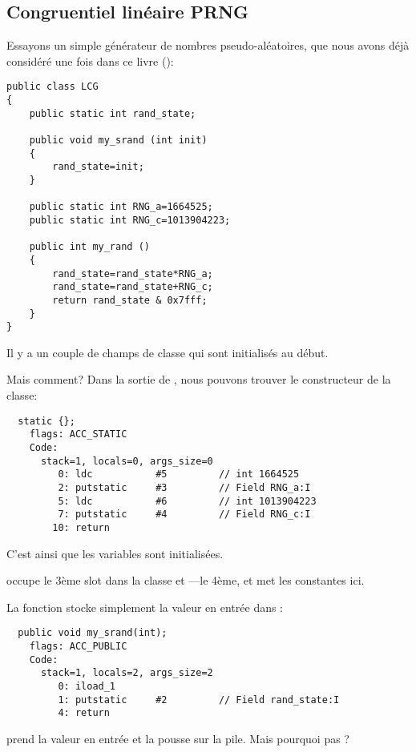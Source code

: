 \subsection{Congruentiel linéaire \ac{PRNG}}

Essayons un simple générateur de nombres pseudo-aléatoires, que nous avons déjà considéré
une fois dans ce livre ():


\begin{lstlisting}[style=customjava]
public class LCG 
{
	public static int rand_state;

	public void my_srand (int init)
	{
		rand_state=init;
	}

	public static int RNG_a=1664525;
	public static int RNG_c=1013904223;

	public int my_rand ()
	{
		rand_state=rand_state*RNG_a;
		rand_state=rand_state+RNG_c;
		return rand_state & 0x7fff;
	}
}
\end{lstlisting}

Il y a un couple de champs de classe qui sont initialisés au début.

Mais comment?
Dans la sortie de , nous pouvons trouver le constructeur de la classe:


\begin{lstlisting}
  static {};
    flags: ACC_STATIC
    Code:
      stack=1, locals=0, args_size=0
         0: ldc           #5         // int 1664525
         2: putstatic     #3         // Field RNG_a:I
         5: ldc           #6         // int 1013904223
         7: putstatic     #4         // Field RNG_c:I
        10: return        
\end{lstlisting}

C'est ainsi que les variables sont initialisées.

 occupe le 3ème slot dans la classe et  ---le 4ème,
et  met les constantes ici.


La fonction  stocke simplement la valeur en entrée dans :


\begin{lstlisting}
  public void my_srand(int);
    flags: ACC_PUBLIC
    Code:
      stack=1, locals=2, args_size=2
         0: iload_1       
         1: putstatic     #2         // Field rand_state:I
         4: return        
\end{lstlisting}

 prend la valeur en entrée et la pousse sur la pile. Mais pourquoi pas
?

